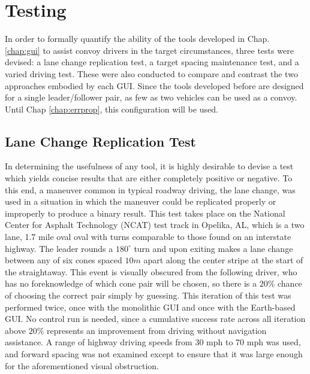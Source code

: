 \documentclass[12pt]{report}
\begin{document}
\section{Testing} \label{sec:test}
In order to formally quantify the ability of the tools developed in Chap. \ref{chap:gui} to assist convoy drivers in the target circumstances, three tests were devised: a lane change replication test, a target spacing maintenance test, and a varied driving test. These were also conducted to compare and contrast the two approaches embodied by each GUI. Since the tools developed before are designed for a single leader/follower pair, as few as two vehicles can be used as a convoy. Until Chap \ref{chap:errprop}, this configuration will be used.

\subsection{Lane Change Replication Test} \label{sec:lanechangetest}
In determining the usefulness of any tool, it is highly desirable to devise a test which yields concise results that are either completely positive or negative. To this end, a maneuver common in typical roadway driving, the lane change, was used in a situation in which the maneuver could be replicated properly or improperly to produce a binary result. This test takes place on the National Center for Asphalt Technology (NCAT) test track in Opelika, AL, which is a two lane, 1.7 mile oval oval with turns comparable to those found on an interstate highway. The leader rounds a $180^\circ$ turn and upon exiting makes a lane change between any of six cones spaced $10m$ apart along the center stripe at the start of the straightaway. This event is visually obscured from the following driver, who has no foreknowledge of which cone pair will be chosen, so there is a $20\%$ chance of choosing the correct pair simply by guessing. This iteration of this test was performed twice, once with the monolithic GUI and once with the Earth-based GUI. No control run is needed, since a cumulative success rate across all iteration above $20\%$ represents an improvement from driving without navigation assistance. A range of highway driving speeds from 30 mph to 70 mph was used, and forward spacing was not examined except to ensure that it was large enough for the aforementioned visual obstruction.
\end{document}
